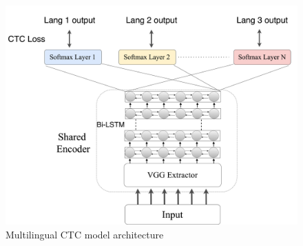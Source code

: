 \begin{figure}[t]
    \centering
    \includegraphics[width=\linewidth]{figs/model_arch.png}
    \caption{Multilingual CTC model architecture}
    \label{fig:model-arch}
\end{figure}
